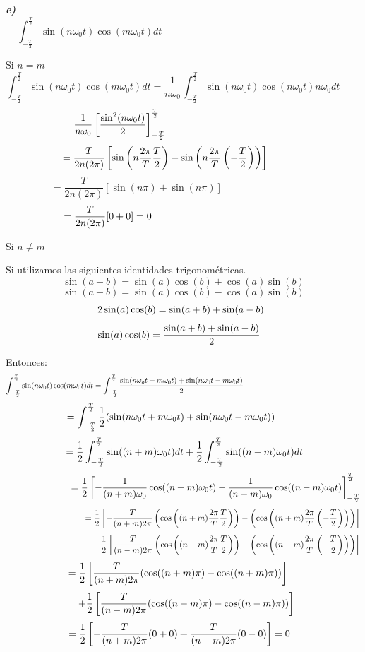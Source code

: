 \documentclass[a4paper]{article}
\begin{document}
{} \textbf{\textit{e)}}  
\[
\int_{-\frac{T}{2}}^{\frac{T}{2}} \sin(n\omega_{0}t)\cos(m\omega_{0}t)dt 
\hspace{8cm}
\]

{} Si $n=m$  
\[
\int_{-\frac{T}{2}}^{\frac{T}{2}} \sin(n\omega_{0}t)\cos(m\omega_{0}t)dt = 
\frac{1}{n\omega_{0}}\int_{-\frac{T}{2}}^{\frac{T}{2}}\sin(n\omega_{0}t)%
\cos(n\omega_{0}t)n\omega_{0}dt \hspace{7cm}
\]
\[
=\frac{1}{n\omega_{0}}\left[\frac{\sin^{2}(n\omega_{0}t)}{2}\right]_{-\frac{T%
}{2}}^{\frac{T}{2}} \hspace{4.9cm}
\]
\[
=\frac{T}{2n(2\pi)}\left[\sin\left(n\frac{2\pi}{T}\frac{T}{2}\right) -
\sin\left(n\frac{2\pi}{T}\left(-\frac{T}{2}\right)\right)\right] \hspace{%
1.3cm}
\]
\[
=\frac{T}{2n(2\pi)}\left[\sin(n\pi)+\sin(n\pi)\right] \hspace{4cm}
\]
\[
=\frac{T}{2n(2\pi)}[0+0]=0 \hspace{5.4cm}
\]

{} Si $n \neq m$ 

{} Si utilizamos las siguientes identidades trigonom\'etricas.  
\[
\sin(a+b)=\sin(a)\cos(b)+\cos(a)\sin(b)
\]
\[
\sin(a-b)=\sin(a)\cos(b)-\cos(a)\sin(b)
\]
\[
2\sin(a)\cos(b)=\sin(a+b)+\sin(a-b) \hspace{0.2cm}
\]
\[
\sin(a)\cos(b)=\frac{\sin(a+b)+\sin(a-b)}{2} \hspace{0.3cm}
\]

{} Entonces:  
\[
\int_{-\frac{T}{2}}^{\frac{T}{2}} \sin(n\omega_{0}t)\cos(m\omega_{0}t)dt=
\int_{-\frac{T}{2}}^{\frac{T}{2}}\frac{\sin(n\omega_{o}t+m\omega_{0}t)+%
\sin(n\omega_{0}t-m\omega_{0}t)}{2}\hspace{5.5cm}
\]
\[
=\int_{-\frac{T}{2}}^{\frac{T}{2}} \frac{1}{2}(\sin(n\omega_{0}t+m%
\omega_{0}t)+\sin(n\omega_{0}t-m\omega_{0}t)) \hspace{0.9cm}
\]
\[
\hspace{0.1cm} = \frac{1}{2}\int_{-\frac{T}{2}}^{\frac{T}{2}%
}\sin((n+m)\omega_{0}t)dt + \frac{1}{2}\int_{-\frac{T}{2}}^{\frac{T}{2}%
}\sin((n-m)\omega_{0}t)dt
\]
\[
\hspace{2.4cm} =\frac{1}{2}\left[-\frac{1}{(n+m)\omega_{0}}%
\cos((n+m)\omega_{0}t) -\frac{1}{(n-m)\omega_{0}}\cos((n-m)\omega_{0}t)%
\right]_{-\frac{T}{2}}^{\frac{T}{2}}
\]
\[
\hspace{3.3cm}=\frac{1}{2}\left[-\frac{T}{(n+m)2\pi}\left(\cos\left((n+m)%
\frac{2\pi}{T}\frac{T}{2}\right) \right) - \left(\cos\left((n+m)\frac{2\pi}{T%
}\left(-\frac{T}{2}\right)\right) \right)\right]
\]
\[
\hspace{3.7cm} -\frac{1}{2}\left[\frac{T}{(n-m)2\pi}\left(\cos\left((n-m)%
\frac{2\pi}{T}\frac{T}{2}\right) \right) - \left(\cos\left((n-m)\frac{2\pi}{T%
}\left(-\frac{T}{2}\right)\right) \right)\right]
\]
\[
=\frac{1}{2}\left[\frac{T}{(n+m)2\pi}(\cos((n+m)\pi)-\cos((n+m)\pi))\right] 
\hspace{0.4cm}
\]
\[
\hspace{0.2cm} +\frac{1}{2}\left[\frac{T}{(n-m)2\pi}(\cos((n-m)\pi)-%
\cos((n-m)\pi))\right] 
\]
\[
=\frac{1}{2}\left[-\frac{T}{(n+m)2\pi}(0+0)+\frac{T}{(n-m)2\pi}(0-0)\right]%
=0 \hspace{0.3cm}
\]
\newline
\end{document}
